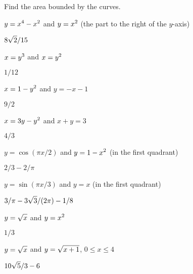 \begin{exercises}

\noindent Find the area bounded by the curves.

\begin{exercise} $\displaystyle y=x^4-x^2$ and $\displaystyle y=x^2$ (the part to the right of the $y$-axis)
\begin{answer} $\displaystyle 8\sqrt2/15$
\end{answer}\end{exercise}

\begin{exercise} $\displaystyle x=y^3$ and $\displaystyle x=y^2$
\begin{answer} $1/12$
\end{answer}\end{exercise}

\begin{exercise} $\displaystyle x=1-y^2$ and $y=-x-1$
\begin{answer} $9/2$
\end{answer}\end{exercise}

\begin{exercise} $\displaystyle x=3y-y^2$ and $x+y=3$
\begin{answer} $4/3$
\end{answer}\end{exercise}

\begin{exercise} $y=\cos(\pi x/2)$ and $\displaystyle y=1- x^2$ (in the first quadrant)
\begin{answer} $2/3-2/\pi$
\end{answer}\end{exercise}

\begin{exercise} $y=\sin(\pi x/3)$ and $y=x$ (in the first quadrant)
\begin{answer} $\displaystyle 3/\pi - 3\sqrt3/(2\pi)-1/8$
\end{answer}\end{exercise}

\begin{exercise} $\displaystyle y=\sqrt{x}$ and $\displaystyle y=x^2$
\begin{answer} $1/3$
\end{answer}\end{exercise}

\begin{exercise} $\displaystyle y=\sqrt x$ and $\displaystyle y=\sqrt{x+1}$, $0\le x\le 4$
\begin{answer} $\displaystyle 10\sqrt{5}/3-6$
\end{answer}\end{exercise}


\end{exercises}
